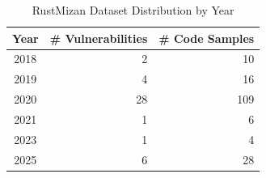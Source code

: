 \begin{table}[htbp]
\centering
\footnotesize
\caption{RustMizan Dataset Distribution by Year}
\label{tab:yearly_distribution}
\begin{tabular}{@{}crr@{}}
\toprule
\textbf{Year} & \textbf{\# Vulnerabilities} & \textbf{\# Code Samples} \\
\midrule
2018 & 2 & 10 \\
2019 & 4 & 16 \\
2020 & 28 & 109 \\
2021 & 1 & 6 \\
2023 & 1 & 4 \\
2025 & 6 & 28 \\
\bottomrule
\end{tabular}
\end{table}
